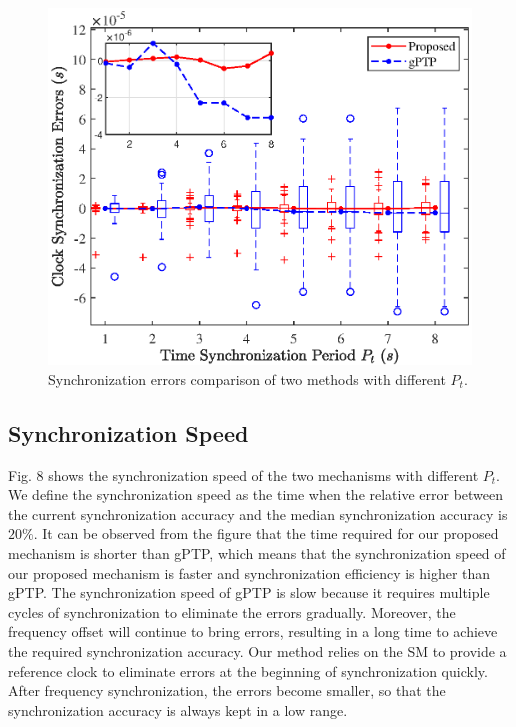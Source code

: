 \documentclass[conference]{IEEEtran}
\begin{document}
\begin{figure}[htbp]
	\centerline{\includegraphics[scale=0.6]{fig7.eps}}
	\caption{Synchronization errors comparison of two methods with different $P_t$.}
	\label{fig7}
\end{figure}

\subsection{Synchronization Speed}
Fig. 8 shows the synchronization speed of the two mechanisms with different $P_t$. We define the synchronization speed as the time when the relative error between the current synchronization accuracy and the median synchronization accuracy is $20\%$. It can be observed from the figure that the time required for our proposed mechanism is shorter than gPTP, which means that the synchronization speed of our proposed mechanism is faster and synchronization efficiency is higher than gPTP. The synchronization speed of gPTP is slow because it requires multiple cycles of synchronization to eliminate the errors gradually. Moreover, the frequency offset will continue to bring errors, resulting in a long time to achieve the required synchronization accuracy. Our method relies on the SM to provide a reference clock to eliminate errors at the beginning of synchronization quickly. After frequency synchronization, the errors become smaller, so that the synchronization accuracy is always kept in a low range.
\end{document}
